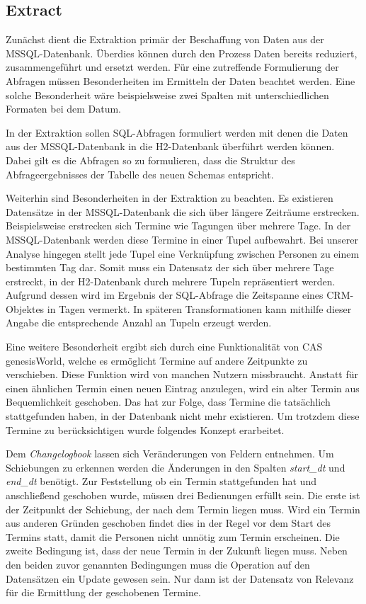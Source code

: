 \subsection{Extract}
\label{ch:konzeption:etl:extract}

Zunächst dient die Extraktion primär der Beschaffung von Daten aus der MSSQL-Datenbank. Überdies können durch den Prozess Daten bereits reduziert,  zusammengeführt und ersetzt werden. Für eine zutreffende Formulierung der Abfragen müssen Besonderheiten im Ermitteln der Daten beachtet werden. Eine solche Besonderheit wäre beispielsweise zwei Spalten mit unterschiedlichen Formaten bei dem Datum.

In der Extraktion sollen SQL-Abfragen formuliert werden mit denen die Daten aus der MSSQL-Datenbank in die H2-Datenbank überführt werden können. Dabei gilt es die Abfragen so zu formulieren, dass die Struktur des Abfrageergebnisses der Tabelle des neuen Schemas entspricht.

Weiterhin sind Besonderheiten in der Extraktion zu beachten. Es existieren Datensätze in der MSSQL-Datenbank die sich über längere Zeiträume erstrecken. Beispielsweise erstrecken sich Termine wie Tagungen über mehrere Tage. In der MSSQL-Datenbank werden diese Termine in einer Tupel aufbewahrt. Bei unserer Analyse hingegen stellt jede Tupel eine Verknüpfung zwischen Personen zu einem bestimmten Tag dar. Somit muss ein Datensatz der sich über mehrere Tage erstreckt, in der H2-Datenbank durch mehrere Tupeln repräsentiert werden. Aufgrund dessen wird im Ergebnis der SQL-Abfrage die Zeitspanne eines CRM-Objektes in Tagen vermerkt. In späteren Transformationen kann mithilfe dieser Angabe die entsprechende Anzahl an Tupeln erzeugt werden.

Eine weitere Besonderheit ergibt sich durch eine Funktionalität von CAS genesisWorld, welche es ermöglicht Termine auf andere Zeitpunkte zu verschieben. Diese Funktion wird von manchen Nutzern missbraucht. Anstatt für einen ähnlichen Termin einen neuen Eintrag anzulegen, wird ein alter Termin aus Bequemlichkeit geschoben. Das hat zur Folge, dass Termine die tatsächlich stattgefunden haben, in der Datenbank nicht mehr existieren. Um trotzdem diese Termine zu berücksichtigen wurde folgendes Konzept erarbeitet. 

Dem \textit{Changelogbook} lassen sich Veränderungen von Feldern entnehmen. Um Schiebungen zu erkennen werden die Änderungen in den Spalten \textit{start\_dt} und \textit{end\_dt} benötigt. Zur Feststellung ob ein Termin stattgefunden hat und anschließend geschoben wurde, müssen drei Bedienungen erfüllt sein. Die erste ist der Zeitpunkt der Schiebung, der nach dem Termin liegen muss. Wird ein Termin aus anderen Gründen geschoben findet dies in der Regel vor dem Start des Termins statt, damit die Personen nicht unnötig zum Termin erscheinen. Die zweite Bedingung ist, dass der neue Termin in der Zukunft liegen muss. Neben den beiden zuvor genannten Bedingungen muss die Operation auf den Datensätzen ein Update gewesen sein. Nur dann ist der Datensatz von Relevanz für die Ermittlung der geschobenen Termine. 

